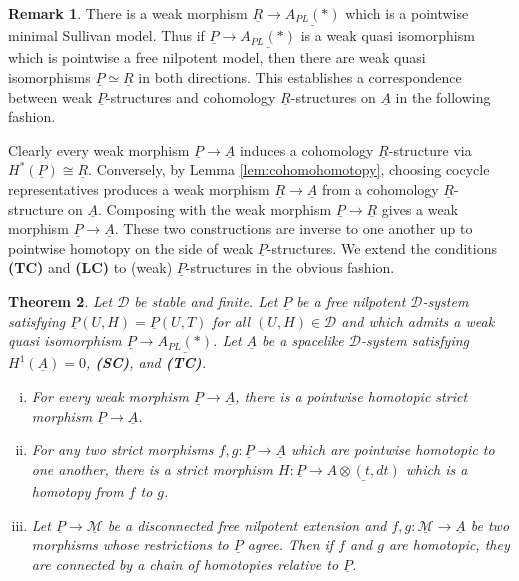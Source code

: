 \documentclass[12pt,a4paper]{article}
\newtheorem{thm}{Theorem}[section]
\theoremstyle{definition}
\newtheorem{rem}[thm]{Remark}
\begin{document}
\begin{rem}\label{rem:weakvscohomology}
There is a weak morphism $\underline{R}\rightarrow \underline{A_{PL}(*)}$ which is a pointwise minimal Sullivan model. Thus if $\underline{P}\rightarrow\underline{A_{PL}(*)}$ is a weak quasi isomorphism which is pointwise a free nilpotent model, then there are weak quasi isomorphisms $\underline{P}\simeq\underline{R}$ in both directions. This establishes a correspondence between weak $\underline{P}$-structures and cohomology $\underline{R}$-structures on $\underline{A}$ in the following fashion.

Clearly every weak morphism $\underline{P}\rightarrow\underline{A}$ induces a cohomology $\underline{R}$-structure via $H^*(\underline{P})\cong\underline{R}$. Conversely, by Lemma \ref{lem:cohomohomotopy}, choosing cocycle representatives produces a weak morphism $\underline{R}\rightarrow \underline{A}$ from a cohomology $\underline{R}$-structure on $\underline{A}$. Composing with the weak morphism $\underline{P}\rightarrow \underline{R}$ gives a weak morphism $\underline{P}\rightarrow\underline{A}$. These two constructions are inverse to one another up to pointwise homotopy on the side of weak $\underline{P}$-structures.
We extend the conditions \textbf{(TC)} and \textbf{(LC)} to (weak) $\underline{P}$-structures in the obvious fashion.
\end{rem}

\begin{thm}\label{thm:strictification}
Let $\mathcal{D}$ be stable and finite.
Let $\underline{P}$ be a free nilpotent $\mathcal{D}$-system satisfying $\underline{P}(U,H)=\underline{P}(U,T)$ for all $(U,H)\in \mathcal{D}$ and which admits a weak quasi isomorphism $\underline{P}\rightarrow \underline{A_{PL}(*)}$. Let $\underline{A}$ be a spacelike $\mathcal{D}$-system satisfying $H^1(\underline{A})=0$, \textbf{(SC)}, and \textbf{(TC)}.
\begin{enumerate}[(i)]
\item For every weak morphism $\underline{P}\rightarrow \underline{A}$, there is a pointwise homotopic strict morphism $\underline{P}\rightarrow\underline{A}$.
\item For any two strict morphisms $f,g\colon\underline{P}\rightarrow \underline{A}$ which are pointwise homotopic to one another, there is a strict morphism $H\colon \underline{P}\rightarrow \underline{A\otimes (t,dt)}$ which is a homotopy from $f$ to $g$.
\item Let $\underline{P}\rightarrow\underline{\mathcal{M}}$ be a disconnected free nilpotent extension and $f,g\colon \underline{\mathcal{M}}\rightarrow \underline{A}$ be two morphisms whose restrictions to $\underline{P}$ agree. Then if $f$ and $g$ are homotopic, they are connected by a chain of homotopies relative to $\underline{P}$.
\end{enumerate}
\end{thm}
\end{document}
